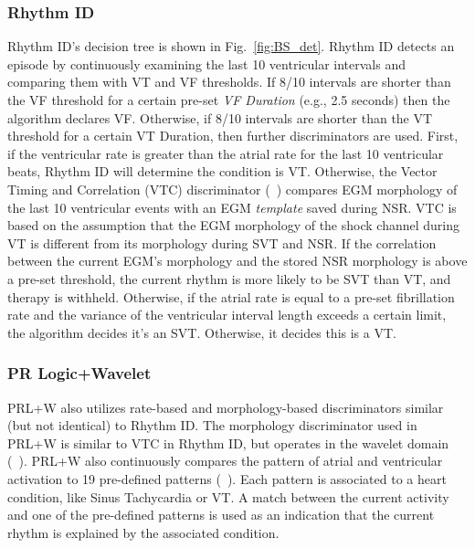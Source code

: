\subsubsection{Rhythm ID}
Rhythm ID's decision tree is shown in Fig.~\ref{fig:BS_det}.
Rhythm ID detects an episode by continuously examining the last 10 ventricular intervals and comparing them with VT and VF thresholds. 
If 8/10 intervals are shorter than the VF threshold for a certain pre-set \emph{VF Duration} (e.g., 2.5 seconds) then the algorithm declares VF.
Otherwise, if 8/10 intervals are shorter than the VT threshold for a certain VT Duration, then further discriminators are used.
First, if the ventricular rate is greater than the atrial rate for the last 10 ventricular beats, Rhythm ID will determine the condition is VT.
Otherwise, the Vector Timing and Correlation (VTC) discriminator (~\cite{VTC}) compares EGM morphology of the last 10 ventricular events with an EGM \emph{template} saved during NSR.
VTC is based on the assumption that the EGM morphology of the shock channel during VT is different from its morphology during SVT and NSR.
If the correlation between the current EGM's morphology and the stored NSR morphology is above a pre-set threshold, the current rhythm is more likely to be SVT than VT, and therapy is withheld.
Otherwise, if the atrial rate is equal to a pre-set fibrillation rate and the variance of the ventricular interval length exceeds a certain limit, the algorithm decides it's an SVT. 
Otherwise, it decides this is a VT.

\subsubsection{PR Logic+Wavelet}
PRL+W also utilizes rate-based and morphology-based discriminators similar (but not identical) to Rhythm ID.
The morphology discriminator used in PRL+W  is similar to VTC in Rhythm ID, but operates in the wavelet domain (~\cite{Wavelet}).
PRL+W also continuously compares the pattern of atrial and ventricular activation to 19 pre-defined patterns (~\cite{Singer}).
Each pattern is associated to a heart condition, like Sinus Tachycardia or VT.
A match between the current activity and one of the pre-defined patterns is used as an indication that the current rhythm is explained by the associated condition.

